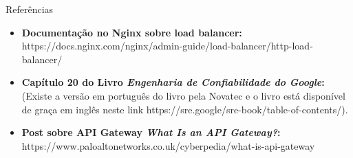 \begin{frame}[fragile]{Referências}
    \begin{itemize}%
        \item \textbf{Documentação no Nginx sobre load balancer:} https://docs.nginx.com/nginx/admin-guide/load-balancer/http-load-balancer/
        \item \textbf{Capítulo 20 do Livro \textit{Engenharia de Confiabilidade do Google}:} (Existe a versão em português do livro pela Novatec e o livro está disponível de graça em inglês neste link https://sre.google/sre-book/table-of-contents/).
        \item \textbf{Post sobre API Gateway \textit{What Is an API Gateway?}:} https://www.paloaltonetworks.co.uk/cyberpedia/what-is-api-gateway
    \end{itemize}
\end{frame}

